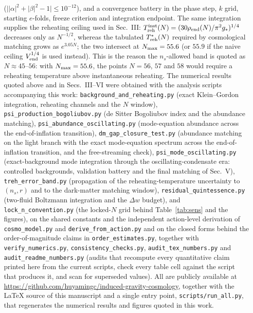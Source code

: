 \documentclass[pdflatex,sn-mathphys-num]{sn-jnl}
\providecommand{\lesssim}{\leq}
\theoremstyle{thmstyleone}
\begin{document}
\begin{appendices}
($\bigl||\alpha|^2+|\beta|^2-1\bigr|\lesssim10^{-12}$), and a convergence battery in the phase step, $k$ grid, starting $e$-folds, freeze criterion and integration endpoint. The same integration supplies the reheating ceiling used in Sec.~III: $T_{\rm reh}^{\rm inst}(N)=(30\rho_{\rm end}(N)/\pi^2g_*)^{1/4}$ decreases only as $N^{-1/2}$, whereas the tabulated $T^*_{\rm reh}(N)$ required by cosmological matching grows as $e^{3.05N}$; the two intersect at $N_{\rm max}=55.6$ (or $55.9$ if the naive ceiling $V_{\rm end}^{1/4}$ is used instead). This is the reason the $n_s$-allowed band is quoted as $N\approx45$--$56$: with $N_{\rm max}=55.6$, the points $N=56$, $57$ and $58$ would require a reheating temperature above instantaneous reheating. The numerical results quoted above and in Secs.~III--VI were obtained with the analysis scripts accompanying this work: \texttt{background\_and\_reheating.py} (exact Klein--Gordon integration, reheating channels and the $N$ window), \texttt{psi\_production\_bogoliubov.py} (de Sitter Bogoliubov index and the abundance matching), \texttt{psi\_abundance\_oscillating.py} (mode-equation abundance across the end-of-inflation transition), \texttt{dm\_gap\_closure\_test.py} (abundance matching on the light branch with the exact mode-equation spectrum across the end-of-inflation transition, and the free-streaming check), \texttt{psi\_mode\_oscillating.py} (exact-background mode integration through the oscillating-condensate era: controlled backgrounds, validation battery and the final matching of Sec.~V), \texttt{treh\_error\_band.py} (propagation of the reheating-temperature uncertainty to $(n_s,r)$ and to the dark-matter matching window), \texttt{residual\_quintessence.py} (two-fluid Boltzmann integration and the $\Delta w$ budget), and \texttt{lock\_n\_convention.py} (the locked-$N$ grid behind Table~\ref{tab:sens} and the figures), on the shared constants and the independent action-level derivation of \texttt{cosmo\_model.py} and \texttt{derive\_from\_action.py} and on the closed forms behind the order-of-magnitude claims in \texttt{order\_estimates.py}, together with \texttt{verify\_numerics.py}, \texttt{consistency\_checks.py}, \texttt{audit\_tex\_numbers.py} and \texttt{audit\_readme\_numbers.py} (audits that recompute every quantitative claim printed here from the current scripts, check every table cell against the script that produces it, and scan for superseded values). All are publicly available at \url{https://github.com/huyamingc/induced-gravity-cosmology}, together with the \LaTeX{} source of this manuscript and a single entry point, \texttt{scripts/run\_all.py}, that regenerates the numerical results and figures quoted in this work.


\end{appendices}
\end{document}
